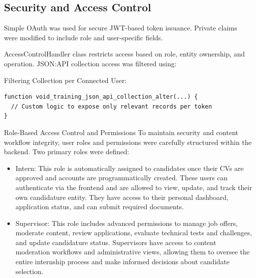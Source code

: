 \subsection{Security and Access Control}
Simple OAuth was used for secure JWT-based token issuance. Private claims were modified to include role and user-specific fields.

AccessControlHandler class restricts access based on role, entity ownership, and operation. JSON:API collection access was filtered using:

Filtering Collection per Connected User:
\begin{verbatim}
function void_training_json_api_collection_alter(...) {
  // Custom logic to expose only relevant records per token
}
\end{verbatim}

Role-Based Access Control and Permissions
To maintain security and content workflow integrity, user roles and permissions were carefully structured within the backend. Two primary roles were defined:
\begin{itemize}
    \item Intern: This role is automatically assigned to candidates once their CVs are approved and accounts are programmatically created. These users can authenticate via the frontend and are allowed to view, update, and track their own candidature entity. They have access to their personal dashboard, application status, and can submit required documents.
    \item Supervisor: This role includes advanced permissions to manage job offers, moderate content, review applications, evaluate technical tests and challenges, and update candidature status. Supervisors have access to content moderation workflows and administrative views, allowing them to oversee the entire internship process and make informed decisions about candidate selection.
\end{itemize}